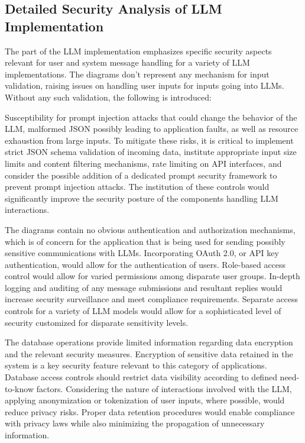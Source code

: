 \documentclass[sigconf]{acmart}
\begin{document}
\subsection{Detailed Security Analysis of LLM Implementation}
The part of the LLM implementation emphasizes specific security aspects relevant for user and system message handling for a variety of LLM implementations. The diagrams don't represent any mechanism for input validation, raising issues on handling user inputs for inputs going into LLMs. Without any such validation, the following is introduced:

Susceptibility for prompt injection attacks that could change the behavior of the LLM, malformed JSON possibly leading to application faults, as well as resource exhaustion from large inputs. To mitigate these risks, it is critical to implement strict JSON schema validation of incoming data, institute appropriate input size limits and content filtering mechanisms, rate limiting on API interfaces, and consider the possible addition of a dedicated prompt security framework to prevent prompt injection attacks. The institution of these controls would significantly improve the security posture of the components handling LLM interactions.

The diagrams contain no obvious authentication and authorization mechanisms, which is of concern for the application that is being used for sending possibly sensitive communications with LLMs. Incorporating OAuth 2.0, or API key authentication, would allow for the authentication of users. Role-based access control would allow for varied permissions among disparate user groups. In-depth logging and auditing of any message submissions and resultant replies would increase security surveillance and meet compliance requirements. Separate access controls for a variety of LLM models would allow for a sophisticated level of security customized for disparate sensitivity levels.

The database operations provide limited information regarding data encryption and the relevant security measures. Encryption of sensitive data retained in the system is a key security feature relevant to this category of applications. Database access controls should restrict data visibility according to defined need-to-know factors. Considering the nature of interactions involved with the LLM, applying anonymization or tokenization of user inputs, where possible, would reduce privacy risks. Proper data retention procedures would enable compliance with privacy laws while also minimizing the propagation of unnecessary information.
\end{document}
